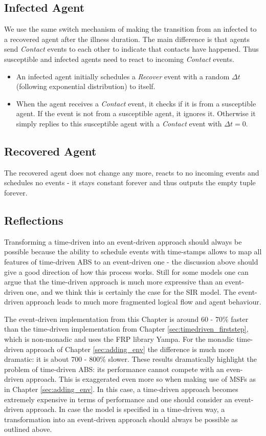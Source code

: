 \subsection{Infected Agent}
We use the same switch mechanism of making the transition from an infected to a recovered agent after the illness duration. The main difference is that agents send \textit{Contact} events to each other to indicate that contacts have happened. Thus susceptible and infected agents need to react to incoming \textit{Contact} events.

\begin{itemize}
	\item An infected agent initially schedules a \textit{Recover} event with a random $\Delta t$ (following exponential distribution) to itself.
	\item When the agent receives a \textit{Contact} event, it checks if it is from a susceptible agent. If the event is not from a susceptible agent, it ignores it. Otherwise it simply replies to this susceptible agent with a \textit{Contact} event with $\Delta t = 0$.
\end{itemize}

\subsection{Recovered Agent}
The recovered agent does not change any more, reacts to no incoming events and schedules no events - it stays constant forever and thus outputs the empty tuple forever.

\subsection{Reflections}
Transforming a time-driven into an event-driven approach should always be possible because the ability to schedule events with time-stamps allows to map all features of time-driven ABS to an event-driven one - the discussion above should give a good direction of how this process works. Still for some models one can argue that the time-driven approach is much more expressive than an event-driven one, and we think this is certainly the case for the SIR model. The event-driven approach leads to much more fragmented logical flow and agent behaviour.

The event-driven implementation from this Chapter is around 60 - 70\% faster than the time-driven implementation from Chapter \ref{sec:timedriven_firststep}, which is non-monadic and uses the FRP library Yampa. For the monadic time-driven approach of Chapter \ref{sec:adding_env} the difference is much more dramatic: it is about 700 - 800\% slower. These results dramatically highlight the problem of time-driven ABS: its performance cannot compete with an even-driven approach. This is exaggerated even more so when making use of MSFs as in Chapter \ref{sec:adding_env}. In this case, a time-driven approach becomes extremely expensive in terms of performance and one should consider an event-driven approach. In case the model is specified in a time-driven way, a transformation into an event-driven approach should always be possible as outlined above.